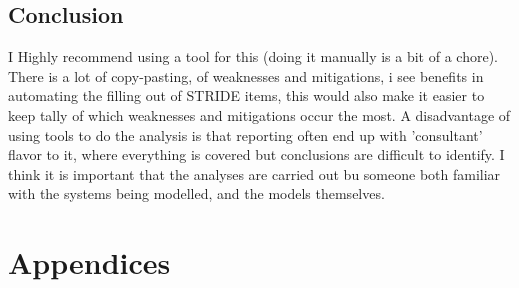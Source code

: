 \documentclass[
	letterpaper, %
	10pt, %
	unnumberedsections, %
	twoside, %
]{APAAssignment}
\begin{document}
\section{Conclusion}
I Highly recommend using a tool for this (doing it manually is a bit of a chore). There is a lot of copy-pasting, of weaknesses and mitigations, i see benefits in automating the filling out of STRIDE items, this would also make it easier to keep tally of which weaknesses and mitigations occur the most. A disadvantage of using tools to do the analysis is that reporting often end up with 'consultant' flavor to it, where everything is covered but conclusions are difficult to identify. I think it is important that the analyses are carried out bu someone both familiar with the systems being modelled, and the models themselves.

\clearpage
\printbibliography %





\appendix


\clearpage
\chapter{Appendices}
\begin{appendices}

\end{appendices}
\end{document}
